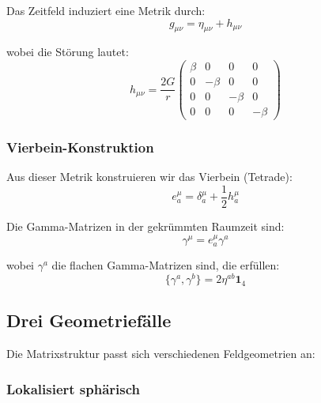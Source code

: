 \documentclass[12pt,a4paper]{article}
\begin{document}
Das Zeitfeld induziert eine Metrik durch:
\begin{equation}
	g_{\mu\nu} = \eta_{\mu\nu} + h_{\mu\nu}
	\label{eq:induzierte_metrik}
\end{equation}

wobei die Störung lautet:
\begin{equation}
	h_{\mu\nu} = \frac{2G}{r} \begin{pmatrix}
		\beta & 0 & 0 & 0 \\
		0 & -\beta & 0 & 0 \\
		0 & 0 & -\beta & 0 \\
		0 & 0 & 0 & -\beta
	\end{pmatrix}
	\label{eq:metrische_stoerung}
\end{equation}

\subsubsection{Vierbein-Konstruktion}
\label{subsubsec:vierbein_konstruktion}

Aus dieser Metrik konstruieren wir das Vierbein (Tetrade):
\begin{equation}
	e^{\mu}_a = \delta^{\mu}_a + \frac{1}{2}h^{\mu}_a
	\label{eq:vierbein}
\end{equation}

Die Gamma-Matrizen in der gekrümmten Raumzeit sind:
\begin{equation}
	\gamma^{\mu} = e^{\mu}_a \gamma^a
	\label{eq:gekruemmte_gamma}
\end{equation}

wobei $\gamma^a$ die flachen Gamma-Matrizen sind, die erfüllen:
\begin{equation}
	\{\gamma^a, \gamma^b\} = 2\eta^{ab}\mathbf{1}_4
	\label{eq:flache_clifford}
\end{equation}

\subsection{Drei Geometriefälle}
\label{subsec:drei_geometrie_matrizes}

Die Matrixstruktur passt sich verschiedenen Feldgeometrien an:

\subsubsection{Lokalisiert sphärisch}
\label{subsubsec:sphaerische_matrizen}
\end{document}
